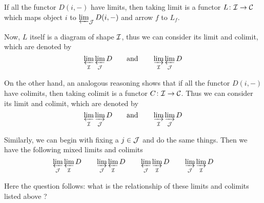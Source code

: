   If all the functor $D(i,-)$ have limits, then taking limit is a functor $L\colon\Ii\to\Cc$ which maps object $i$ to $\invlim_{\Jj} D(i,-)$ and arrow $f$ to $L_f$.

  Now, $L$ itself is a diagram of shape $\Ii$, thus we can consider its limit and colimit, which are denoted by
  \begin{equation*}
    \invlim_{\Ii}\invlim_{\Jj} D \qquad\text{and}\qquad \dirlim_{\Ii}\invlim_{\Jj} D
  \end{equation*}

  On the other hand, an analogous reasoning shows that if all the functor $D(i,-)$ have colimits, then taking colimit is a functor $C\colon\Ii\to\Cc$. Thus we can consider its limit and colimit, which are denoted by
  \begin{equation*}
    \invlim_{\Ii}\dirlim_{\Jj} D \qquad\text{and}\qquad \dirlim_{\Ii}\dirlim_{\Jj} D
  \end{equation*}

  Similarly, we can begin with fixing a $j\in\Jj$ and do the same things. Then we have the following mixed limits and colimits
  \begin{equation*}
    \invlim_{\Jj}\invlim_{\Ii} D \qquad \dirlim_{\Jj}\invlim_{\Ii} D \qquad \invlim_{\Jj}\dirlim_{\Ii} D \qquad \dirlim_{\Jj}\dirlim_{\Ii} D
  \end{equation*}

  Here the question follows: what is the relationship of these limits and colimits listed above ?

